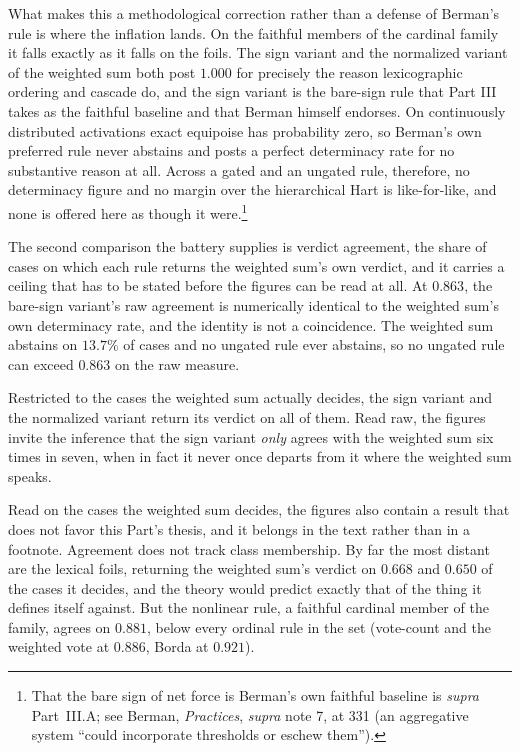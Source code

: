 What makes this a methodological correction rather than a defense of
Berman's rule is where the inflation lands. On the faithful members of the
cardinal family it falls exactly as it falls on the foils.
The sign variant and the normalized variant of the weighted sum both post
$1.000$ for precisely the reason lexicographic ordering and cascade do,
and the sign variant is the bare-sign rule that Part III takes as the
faithful baseline and that Berman himself endorses. On continuously distributed activations exact equipoise has probability
zero, so Berman's own preferred rule never abstains and posts a perfect
determinacy rate for no substantive reason at all. Across a gated and an
ungated rule, therefore, no determinacy figure and no margin over the
hierarchical Hart is like-for-like, and none is offered here as though it
were.\footnote{That the bare sign of net force is Berman's own faithful
baseline is \textit{supra} Part~III.A; see Berman, \textit{Practices},
\textit{supra} note 7, at 331 (an aggregative system ``could incorporate
thresholds or eschew them'').}

The second comparison the battery supplies is verdict agreement, the share
of cases on which each rule returns the weighted sum's own verdict, and it
carries a ceiling that has to be stated before the figures can be read at
all. At $0.863$, the bare-sign variant's raw agreement is numerically
identical to the weighted sum's own determinacy rate, and the identity is
not a coincidence. The weighted sum abstains
on $13.7\%$ of cases and no ungated rule ever abstains, so no ungated
rule can exceed $0.863$ on the raw measure.

Restricted to the cases the
weighted sum actually decides, the sign variant and the normalized
variant return its verdict on all of them. Read raw, the figures invite
the inference that the sign variant \textit{only} agrees with the
weighted sum six times in seven, when in fact it never once departs from
it where the weighted sum speaks.

Read on the cases the weighted sum decides, the figures also contain a
result that does not favor this Part's thesis, and it belongs in the text
rather than in a footnote. Agreement does not track class membership. By
far the most distant are the lexical foils, returning the weighted sum's
verdict on $0.668$ and $0.650$ of the cases it decides, and the theory would
predict exactly that of the thing it defines itself against. But the nonlinear
rule, a faithful cardinal member of the family, agrees on $0.881$, below
every ordinal rule in the set (vote-count and the weighted vote
at $0.886$, Borda at $0.921$).

